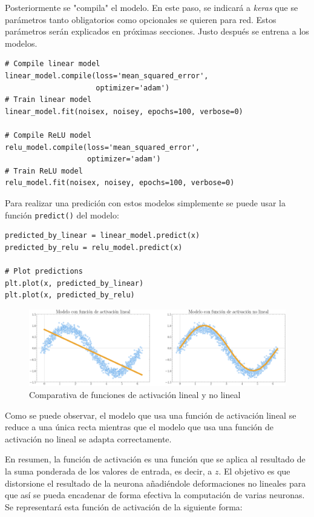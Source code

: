 Posteriormente se "compila" el modelo. En este paso, se indicará a \textit{keras} que se parámetros tanto obligatorios como opcionales se quieren para red. Estos parámetros serán explicados en próximas secciones. Justo después se entrena a los modelos.
\begin{verbatim}
# Compile linear model
linear_model.compile(loss='mean_squared_error', 
                     optimizer='adam')
# Train linear model
linear_model.fit(noisex, noisey, epochs=100, verbose=0)

# Compile ReLU model
relu_model.compile(loss='mean_squared_error',
                   optimizer='adam')
# Train ReLU model
relu_model.fit(noisex, noisey, epochs=100, verbose=0)
\end{verbatim}

Para realizar una predición con estos modelos simplemente se puede usar la función \verb|predict()| del modelo:
\begin{verbatim}
predicted_by_linear = linear_model.predict(x)
predicted_by_relu = relu_model.predict(x)

# Plot predictions
plt.plot(x, predicted_by_linear)
plt.plot(x, predicted_by_relu)
\end{verbatim}

\begin{figure}[H]
    \centering
    \includegraphics[width=15cm]{images/state-of-art/activation-functions/sin_activation_function.png}
    \caption{Comparativa de funciones de activación lineal y no lineal}
    \label{fig:basicneuron}
\end{figure}

Como se puede observar, el modelo que usa una función de activación lineal se reduce a una única recta mientras que el modelo que usa una función de activación no lineal se adapta correctamente.
\newline

En resumen, la función de activación es una función que se aplica al resultado de la suma ponderada de los valores de entrada, es decir, a $z$. El objetivo es que distorsione el resultado de la neurona añadiéndole deformaciones no lineales para que así se pueda encadenar de forma efectiva la computación de varias neuronas. Se representará esta función de activación de la siguiente forma:

